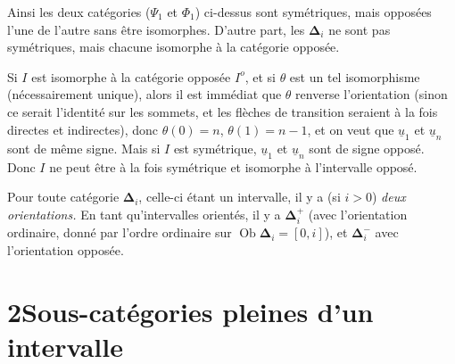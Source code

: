 \documentclass[11pt]{article}
\newcommand{\printedpage}[1]{\marginpar{\footnotesize p.~#1}}
\newcommand{\msp}[1]{\marginpar{\footnotesize [#1]}}
\newcommand{\bD}{\boldsymbol{\Delta}}
\begin{document}
Ainsi les deux catégories ($\Psi_1$ et $\Phi_1$) ci-dessus sont symétriques, mais opposées l'une de l'autre sans être isomorphes. D'autre part, les $\bD_i$ ne sont pas symétriques, mais chacune isomorphe à la catégorie opposée.

Si $I$ est isomorphe à la catégorie opposée $I^o$, et si $\theta$ est un tel isomorphisme (nécessairement unique), alors il est immédiat que $\theta$ renverse l'orientation (sinon ce serait l'identité sur les sommets, et les flèches de transition seraient à la fois directes et indirectes), donc $\theta(0) = n$, $\theta(1) = n-1$, et on veut que $\underline{u}_1$ et $\underline{u}_n$ sont de même signe. Mais si $I$ est symétrique, $\underline{u}_1$ et $\underline{u}_n$ sont de signe opposé. Donc $I$ ne peut être à la fois symétrique et isomorphe à l'intervalle opposé.

Pour toute catégorie $\bD_i$, celle-ci étant un intervalle, il y a (si $i > 0$) \textit{deux orientations.} En tant qu'intervalles orientés, il y a $\bD_i^+$ (avec l'orientation ordinaire, donné par l'ordre ordinaire sur $\operatorname{Ob} \bD_i = [0,i]$), et $\bD_i^-$ avec l'orientation opposée.

\printedpage{6}

\msp{page 10}

\section*{2\quad Sous-catégories pleines d'un intervalle}
\end{document}
